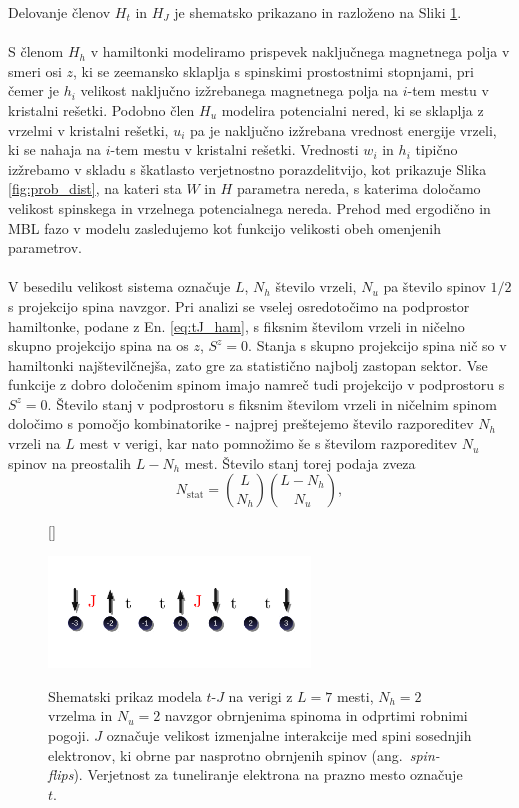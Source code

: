 Delovanje členov $H_t$ in $H_J$ je shematsko prikazano in razloženo na Sliki \ref{fig:tJ_scheme}. \\\\
S členom $H_h$ v hamiltonki modeliramo prispevek naključnega magnetnega polja v smeri osi $z$, ki se zeemansko sklaplja s 
spinskimi prostostnimi stopnjami, pri čemer je $h_i$ velikost naključno izžrebanega magnetnega polja na $i$-tem mestu v kristalni rešetki. Podobno člen $H_u$ modelira potencialni nered, ki se sklaplja z vrzelmi v kristalni rešetki, $u_i$ pa je naključno izžrebana vrednost energije vrzeli, ki se nahaja na $i$-tem mestu v kristalni rešetki. Vrednosti $w_i$ in $h_i$ tipično izžrebamo v skladu s škatlasto verjetnostno porazdelitvijo, kot prikazuje Slika \ref{fig:prob_dist}, na kateri sta $W$ in $H$	 parametra 
nereda, s katerima določamo velikost spinskega in vrzelnega potencialnega nereda. Prehod med ergodično in MBL fazo
v modelu zasledujemo kot funkcijo velikosti obeh omenjenih parametrov.\\\\
V besedilu velikost sistema označuje $L$, $N_h$ število vrzeli, $N_u$ pa število spinov $1/2$ s projekcijo spina navzgor. Pri analizi se vselej osredotočimo na podprostor hamiltonke, podane z En. \eqref{eq:tJ_ham}, s fiksnim številom vrzeli in ničelno skupno projekcijo spina na os $z$, $S^z=0$. Stanja s skupno projekcijo spina nič so v hamiltonki najštevilčnejša, zato gre za statistično najbolj zastopan sektor. Vse funkcije z dobro določenim spinom imajo namreč tudi projekcijo v podprostoru s $S^z=0$. Število stanj v podprostoru s fiksnim številom vrzeli in ničelnim spinom določimo s pomočjo kombinatorike - najprej prešteje{}mo število razporeditev $N_h$ vrzeli na $L$ mest v verigi, kar nato pomnožimo še s številom razporeditev $N_u$ spinov na preostalih $L-N_h$ mest. Število stanj torej podaja zveza
\begin{equation}\label{eq:nstat}
N_\mathrm{stat}=\binom{L}{N_h}\binom{L-N_h}{N_u},
\end{equation}
\begin{figure}[H]
[\FBwidth]
{\caption{Shematski prikaz modela $t$-$J$ na verigi z $L=7$ mesti, $N_h=2$ vrzelma in $N_u=2$ navzgor obrnjenima spinoma in odprtimi robnimi pogoji.	 $J$ označuje velikost izmenjalne interakcije med spini sosednjih elektronov, ki obrne par nasprotno obrnjenih spinov (ang.~\emph{spin-flips}). Verjetnost za tuneliranje elektrona na prazno mesto označuje $t$. }\label{fig:tJ_scheme}}
{\includegraphics[width=0.62\textwidth]{tJ_scheme.pdf}}
\end{figure}
